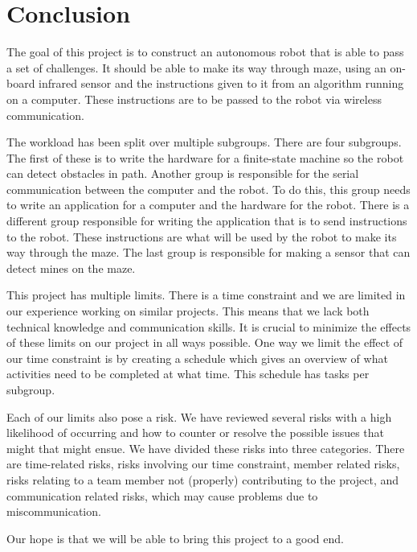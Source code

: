 \chapter{Conclusion} 

The goal of this project is to construct an autonomous robot that is able to pass a set of challenges. It should be able to make its way through maze, using an on-board infrared sensor and the instructions given to it from an algorithm running on a computer. These instructions are to be passed to the robot via wireless communication.

\medskip
The workload has been split over multiple subgroups. There are four subgroups. The first of these is to write the hardware for a finite-state machine so the robot can detect obstacles in path. Another group is responsible for the serial communication between the computer and the robot. To do this, this group needs to write an application for a computer and the hardware for the robot. There is a different group responsible for writing the application that is to send instructions to the robot. These instructions are what will be used by the robot to make its way through the maze. The last group is responsible for making a sensor that can detect mines on the maze.

\medskip
This project has multiple limits. There is a time constraint and we are limited in our experience working on similar projects. This means that we lack both technical knowledge and communication skills. It is crucial to minimize the effects of these limits on our project in all ways possible. One way we limit the effect of our time constraint is by creating a schedule which gives an overview of what activities need to be completed at what time. This schedule has tasks per subgroup.

\medskip
Each of our limits also pose a risk. We have reviewed several risks with a high likelihood of occurring and how to counter or resolve the possible issues that might that might ensue. We have divided these risks into three categories. There are time-related risks, risks involving our time constraint, member related risks, risks relating to a team member not (properly) contributing to the project, and communication related risks, which may cause problems due to miscommunication.

\medskip
Our hope is that we will be able to bring this project to a good end. 
